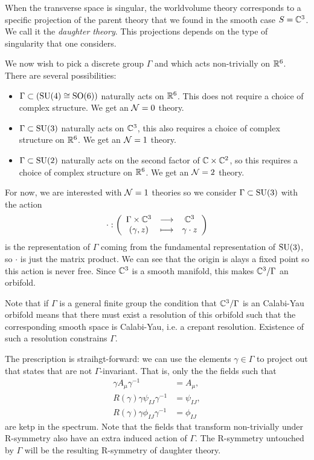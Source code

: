 \documentclass[a4paper,11pt]{article}
\begin{document}
    When the transverse space is singular, the worldvolume theory corresponds to a specific projection of the parent theory that we found in the smooth case $S=\mathbb{C}^3$. We call it the \emph{daughter theory}. This projections depends on the type of singularity that one considers.

    We now wish to pick a discrete group $\Gamma$ and which acts non-trivially on $\mathbb{R}^6$. There are several possibilities:
    \begin{itemize}
        \item $\Gamma\subset(\text{SU}(4)\cong\text{SO}(6))$ naturally acts on $\mathbb{R}^6$. This does not require a choice of complex structure. We get an $\mathcal{N}=0$ theory.
        \item $\Gamma\subset\text{SU}(3)$ naturally acts on $\mathbb{C}^3$, this also requires a choice of complex structure on $\mathbb{R}^6$. We get an $\mathcal{N}=1$ theory.
        \item $\Gamma\subset\text{SU}(2)$ naturally acts on the second factor of $\mathbb{C}\times\mathbb{C}^2$, so this requires a choice of complex structure on $\mathbb{R}^6$. We get an $\mathcal{N}=2$ theory.
    \end{itemize}

    For now, we are interested with $\mathcal{N}=1$ theories so we consider $\Gamma\subset\text{SU}(3)$ with the action
    \begin{equation*}
        \cdot:\left(
        \begin{array}{ccc}
            \Gamma\times\mathbb{C}^3 & \longrightarrow & \mathbb{C}^3 \\
            (\gamma,z) & \longmapsto & \gamma\cdot z
        \end{array}
        \right)
    \end{equation*}
    is the representation of $\Gamma$ coming from the fundamental representation of $\text{SU}(3)$, so $\cdot$ is just the matrix product. We can see that the origin is alays a fixed point so this action is never free. Since $\mathbb{C}^3$ is a smooth manifold, this makes $\mathbb{C}^3/\Gamma$ an orbifold.

    Note that if $\Gamma$ is a general finite group the condition that $\mathbb{C}^3/\Gamma$ is an Calabi-Yau orbifold means that there must exist a resolution of this orbifold such that the corresponding smooth space is Calabi-Yau, i.e. a crepant resolution. Existence of such a resolution constrains $\Gamma$\marker.

    The prescription is straihgt-forward: we can use the elements $\gamma\in\Gamma$ to project out that states that are not $\Gamma$-invariant. That is, only the the fields such that
    \begin{align}
        \gamma A_\mu \gamma^{-1} &= A_\mu,\\
        R(\gamma)\gamma \psi_{IJ} \gamma^{-1} &= \psi_{IJ},\\
        R(\gamma)\gamma \phi_{IJ} \gamma^{-1} &= \phi_{IJ}
    \end{align}
    are ketp in the spectrum. Note that the fields that transform non-trivially under R-symmetry also have an extra induced action of $\Gamma$. The R-symmetry untouched by $\Gamma$ will be the resulting R-symmetry of daughter theory.
\end{document}
